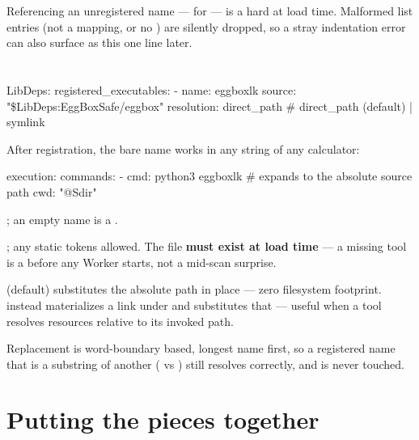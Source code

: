 Referencing an unregistered name ---  for  ---
is a hard  at load time. Malformed list entries (not a mapping, or no
) are silently dropped, so a stray indentation error can also surface as
this  one line later.

\section{}
\label{sec:registered-executables}

\begin{yamlwin}
LibDeps:
  registered_executables:
    - name: eggboxlk
      source: "\${LibDeps:EggBoxSafe}/eggbox"
      resolution: direct_path        # direct_path (default) | symlink
\end{yamlwin}

After registration, the bare name works in any  string of any calculator:

\begin{yamlwin}
execution:
  commands:
    - cmd: python3 eggboxlk          # expands to the absolute source path
      cwd: "@Sdir"
\end{yamlwin}

\begin{keylist}
  \item[name] \req; an empty name is a .
  \item[source] \req; any static tokens allowed. The file \textbf{must exist at load
        time} --- a missing tool is a  before any Worker starts,
        not a mid-scan surprise.
  \item[resolution]  (default) substitutes the absolute path in
        place --- zero filesystem footprint.  instead materializes a link
        under  and substitutes that ---
        useful when a tool resolves resources relative to its invoked path.
\end{keylist}

Replacement is word-boundary based, longest name first, so a registered name that is a
substring of another ( vs ) still resolves correctly, and
 is never touched.

\section{Putting the pieces together}
\label{sec:libdeps-pattern}

